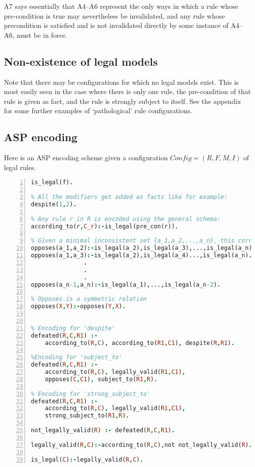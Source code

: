 A7 says essentially that A4--A6 represent the only ways in which a rule whose pre-condition is true may nevertheless be invalidated, and any rule whose precondition is satisfied and is not invalidated directly by some instance of A4--A6, must be in force. 


\subsection{Non-existence of legal models}
Note that there may be configurations for which no legal models exist. This is most easily seen in the case where there is only one rule, the pre-condition of that rule is given as fact, and the rule is strongly subject to itself. See the appendix for some further examples of `pathological' rule configurations.

\subsection{ASP encoding}
Here is an ASP encoding scheme given a configuration $Config = (R,F,M,I)$ of legal rules.
\begin{lstlisting}[language=Prolog, numbers=left]
% For any f in F, we have:
is_legal(f). 

% All the modifiers get added as facts like for example:
despite(1,2).

% Any rule r in R is encoded using the general schema:
according_to(r,C_r):-is_legal(pre_con(r)).

% Given a minimal inconsistent set {a_1,a_2,...,a_n}, this corresponds to a set of rules:
opposes(a_1,a_2):-is_legal(a_2),is_legal(a_3),...,is_legal(a_n).
opposes(a_1,a_3):-is_legal(a_2),is_legal(a_4)...,is_legal(a_n).
               .
               .
               .
opposes(a_n-1,a_n):-is_legal(a_1),...,is_legal(a_n-2).               

% Opposes is a symmetric relation
opposes(X,Y):-opposes(Y,X).


% Encoding for 'despite'
defeated(R,C,R1) :-
    according_to(R,C), according_to(R1,C1), despite(R,R1).

%Encoding for 'subject_to'
defeated(R,C,R1) :-
    according_to(R,C), legally_valid(R1,C1),
    opposes(C,C1), subject_to(R1,R).

% Encoding for 'strong_subject_to'
defeated(R,C,R1) :-
    according_to(R,C), legally_valid(R1,C1),
    strong_subject_to(R1,R).

not_legally_valid(R) :- defeated(R,C,R1).

legally_valid(R,C):-according_to(R,C),not not_legally_valid(R).

is_legal(C):-legally_valid(R,C).
\end{lstlisting}
